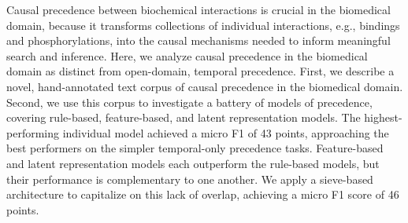 Causal precedence between biochemical interactions is crucial in the biomedical domain, because it transforms collections of individual interactions, e.g., bindings and phosphorylations, into the causal mechanisms needed to inform meaningful search and inference. Here, we analyze causal precedence in the biomedical domain as distinct from open-domain, temporal precedence. First, we describe a novel, hand-annotated text corpus of causal precedence in the biomedical domain. Second, we use this corpus to investigate a battery of models of precedence, covering rule-based, feature-based, and latent representation models. The highest-performing individual model achieved a micro F1 of 43 points, approaching the best performers on the simpler temporal-only precedence tasks. Feature-based and latent representation models each outperform the rule-based models, but their performance is complementary to one another. We apply a sieve-based architecture to capitalize on this lack of overlap, achieving a micro F1 score of 46 points.
